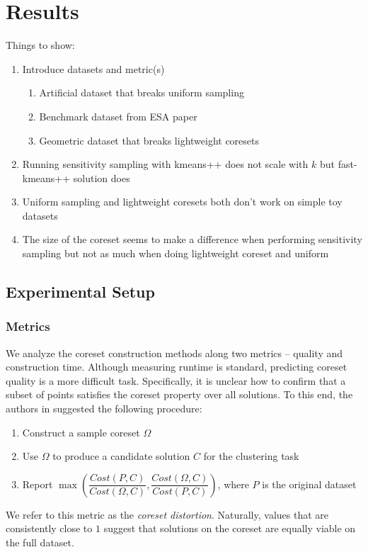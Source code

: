\section{Results}
Things to show:
\begin{enumerate}
    \item Introduce datasets and metric(s)
    \begin{enumerate}
        \item Artificial dataset that breaks uniform sampling
        \item Benchmark dataset from ESA paper
        \item Geometric dataset that breaks lightweight coresets
    \end{enumerate}
    \item Running sensitivity sampling with kmeans++ does not scale with $k$ but fast-kmeans++ solution does
    \item Uniform sampling and lightweight coresets both don't work on simple toy datasets
    \item The size of the coreset seems to make a difference when performing sensitivity sampling but not as much
          when doing lightweight coreset and uniform
\end{enumerate}

\subsection{Experimental Setup}
\subsubsection{Metrics}

We analyze the coreset construction methods along two metrics -- quality and construction time.  Although measuring runtime is standard, predicting coreset
quality is a more difficult task. Specifically, it is unclear how to confirm that a subset of points satisfies the coreset property over all solutions. To this
end, the authors in \cite{chrisESA} suggested the following procedure:
\begin{enumerate}
    \item Construct a sample coreset $\Omega$
    \item Use $\Omega$ to produce a candidate solution $C$ for the clustering task
    \item Report $\max \left( \dfrac{Cost(P, C)}{Cost(\Omega, C)}, \dfrac{Cost(\Omega, C)}{Cost(P, C)} \right)$, where $P$ is the original dataset
\end{enumerate}
We refer to this metric as the \emph{coreset distortion}. Naturally, values that are consistently close to $1$ suggest that solutions on the coreset are equally
viable on the full dataset.

